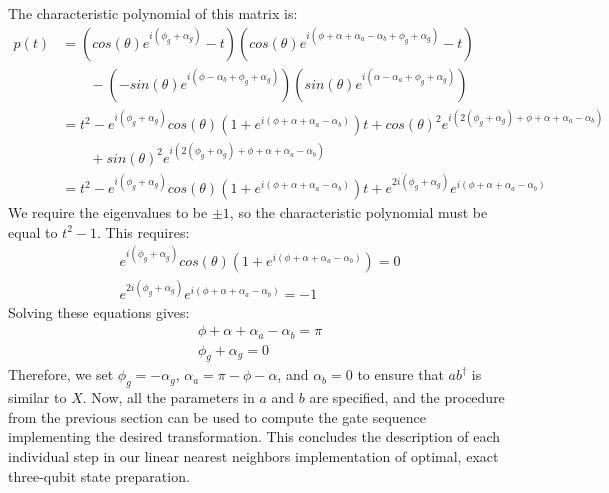 The characteristic polynomial of this matrix is:
\begin{align}
p(t) &= (cos(\theta)e^{i(\phi_g + \alpha_g)} - t)
(cos(\theta)e^{i(\phi + \alpha + \alpha_a - \alpha_b + \phi_g + \alpha_g)} - t) \nonumber \\
&\quad \quad - (-sin(\theta)e^{i(\phi - \alpha_b + \phi_g + \alpha_g)})
  (sin(\theta)e^{i(\alpha - \alpha_a + \phi_g + \alpha_g)}) \nonumber \\
 &= t^2 - e^{i(\phi_g + \alpha_g)}cos(\theta)(1 + e^{i(\phi + \alpha + \alpha_a - \alpha_b)})t 
  + cos(\theta)^2e^{i(2(\phi_g + \alpha_g) + \phi + \alpha + \alpha_a - \alpha_b)} \nonumber \\
  &\quad \quad+ sin(\theta)^2e^{i(2(\phi_g + \alpha_g) + \phi + \alpha + \alpha_a - \alpha_b)} \nonumber \\
 &= t^2 - e^{i(\phi_g + \alpha_g)}cos(\theta)(1 + e^{i(\phi + \alpha + \alpha_a - \alpha_b)})t + e^{2i(\phi_g + \alpha_g)}e^{i(\phi + \alpha + \alpha_a - \alpha_b)}
\end{align}
We require the eigenvalues to be $\pm 1$, so the characteristic polynomial must
be equal to $t^2 - 1$. This requires:
\begin{align}
e^{i(\phi_g + \alpha_g)}cos(\theta)(1 + e^{i(\phi + \alpha + \alpha_a - \alpha_b)}) = 0 \nonumber \\
e^{2i(\phi_g + \alpha_g)}e^{i(\phi + \alpha + \alpha_a - \alpha_b)} = -1
\end{align}
Solving these equations gives:
\begin{align}
\phi + \alpha + \alpha_a - \alpha_b = \pi \nonumber \\
\phi_g + \alpha_g = 0
\end{align}
Therefore, we set $\phi_g = -\alpha_g$, $\alpha_a = \pi - \phi - \alpha$, and
$\alpha_b = 0$ to ensure that $ab^\dagger$ is similar to $X$. Now, all the
parameters in $a$ and $b$ are specified, and the procedure from the previous
section can be used to compute the gate sequence implementing the desired
transformation. This concludes the description of each individual step in our
linear nearest neighbors implementation of optimal, exact three-qubit state
preparation.

